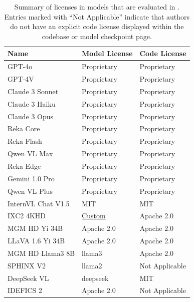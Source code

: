 \begin{table}[h]
\centering
\caption{Summary of licenses in models that are evaluated in \ours{}. Entries marked with ``Not Applicable'' indicate that authors do not have an explicit code license displayed within the codebase or model checkpoint page.}
\begin{tabular}{lll}
\hline
\toprule
\textbf{Name}        & \textbf{Model License} & \textbf{Code License} \\
\midrule
GPT-4o               & Proprietary            & Proprietary           \\
GPT-4V               & Proprietary            & Proprietary           \\
Claude 3 Sonnet      & Proprietary            & Proprietary           \\
Claude 3 Haiku       & Proprietary            & Proprietary           \\
Claude 3 Opus        & Proprietary            & Proprietary           \\
Reka Core            & Proprietary            & Proprietary           \\
Reka Flash           & Proprietary            & Proprietary           \\
Qwen VL Max          & Proprietary            & Proprietary           \\
Reka Edge            & Proprietary            & Proprietary           \\
Gemini 1.0 Pro       & Proprietary            & Proprietary           \\
Qwen VL Plus         & Proprietary            & Proprietary           \\
InternVL Chat V1.5   & MIT                    & MIT                   \\
IXC2 4KHD            & \href{https://huggingface.co/internlm/internlm-xcomposer2-4khd-7b}{Custom}                 & Apache 2.0            \\
MGM HD Yi 34B        & Apache 2.0             & Apache 2.0            \\
LLaVA 1.6 Yi 34B     & Apache 2.0             & Apache 2.0            \\
MGM HD Llama3 8B     & llama3                 & Apache 2.0            \\
SPHINX V2            & llama2                 & Not Applicable        \\
DeepSeek VL          & deepseek               & MIT                   \\
IDEFICS 2            & Apache 2.0             & Not Applicable        \\

\end{tabular}
\end{table}
